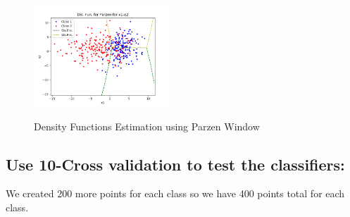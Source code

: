 \documentclass[11pt, oneside]{article}   	%
\begin{document}
\begin{figure}
\begin{center}
{	\includegraphics[width=0.45\textwidth]{x1-x2-Disc-func-parzen-before.png}
	\label{absorbing}
	}
\end{center}
\caption{Density Functions Estimation using Parzen Window}
\end{figure}


\subsection{Use 10-Cross validation to test the classifiers:}
We created 200 more points for each class so we have 400 points total for each class.\\
\end{document}
